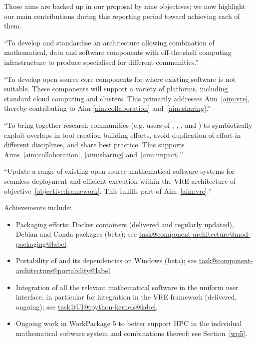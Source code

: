 \documentclass{deliverablereport}
\makeatletter
\newcommand\localtaskref[2]{\hyperref[#1@#2]{\csname task@#1@#2@label\endcsname}}
\makeatother
\begin{document}
Those aims are backed up in our proposal by nine objectives; we now
highlight our main contributions during this reporting period toward
achieving each of them.

\begin{compactenum}
\item\label{objective:framework} ``To develop and standardise an
  architecture allowing combination of mathematical, data and software
  components with off-the-shelf computing infrastructure to produce
  specialised \VREs for different communities.''


\item\label{objectives:core} ``To develop open source core components
  for \VREs where existing software is not suitable. These components
  will support a variety of platforms, including standard cloud
  computing and clusters. This primarily addresses Aim~\ref{aim:vre},
  thereby contributing to Aim \ref{aim:collaboration}
  and~\ref{aim:sharing}.''


\item \label{objective:community} ``To bring together research
  communities (e.g. users of \Jupyter, \Sage, \Singular, and \GAP) to
  symbiotically exploit overlaps in tool creation building efforts,
  avoid duplication of effort in different disciplines, and share best
  practice. This supports Aims~\ref{aim:collaboration},
  \ref{aim:sharing} and~\ref{aim:impact}.''



\item \label{objective:updates} ``Update a range of existing open source
  mathematical software systems for seamless deployment and efficient
  execution within the VRE architecture of objective~\ref{objective:framework}.
  This fulfills part of Aim~\ref{aim:vre}.''

  Achievements include:
  \begin{itemize}
  \item Packaging efforts: Docker containers (delivered and
    regularly updated), Debian and Conda packages (beta); see
    \localtaskref{component-architecture}{mod-packaging}.
  \item Portability of \Sage and its dependencies on Windows (beta);
    see \localtaskref{component-architecture}{portability}.
  \item Integration of all the relevant mathematical software in the
    uniform \Jupyter user interface, in particular for integration in
    the VRE framework (delivered, ongoing); see
    \localtaskref{UI}{ipython-kernels}.
  \item Ongoing work in WorkPackage 5 to better support HPC in the
    individual mathematical software system and combinations thereof;
    see Section~\ref{wp5}.
  \end{itemize}


\end{compactenum}
\end{document}
